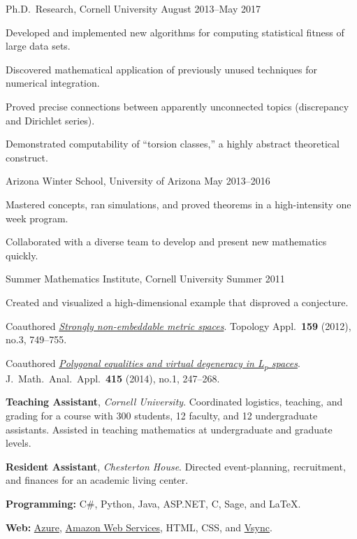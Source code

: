 \documentclass[11pt, letterpaper]{awesome-cv}
\begin{document}

\begin{cventries}

\cventry
	{Ph.D.~Research, Cornell University}
	{}{}
	{August 2013--May 2017}
	{
		\begin{cvitems}
			\item{Developed and implemented new algorithms for computing statistical fitness of large data sets.}
			\item{Discovered mathematical application of previously unused techniques for numerical integration.}
			\item{Proved precise connections between apparently unconnected topics (discrepancy and Dirichlet series).}
			\item{Demonstrated computability of ``torsion classes,'' a highly abstract theoretical construct.}
		\end{cvitems}
	}
		
\cventry
	{Arizona Winter School, University of Arizona}
	{}{}
	{May 2013--2016}
	{
		\begin{cvitems}
			\item{Mastered concepts, ran simulations, and proved theorems in a high-intensity one week program.}
			\item{Collaborated with a diverse team to develop and present new mathematics quickly.}
		\end{cvitems}
	}
	
\cventry
	{Summer Mathematics Institute, Cornell University}
	{}{}
	{Summer 2011}
	{
		\begin{cvitems}
			\item{Created and visualized a high-dimensional example that disproved a conjecture.}
			\item{Coauthored \href{http://dx.doi.org/10.1016/j.topol.2011.11.041}{\emph{Strongly non-embeddable metric spaces}}. Topology Appl.~\textbf{159} (2012), no.3, 749--755.}
			\item{Coauthored \href{http://dx.doi.org/10.1016/j.jmaa.2014.01.063}{\emph{Polygonal equalities and virtual degeneracy in L\textsubscript{p} spaces}}. J.~Math.~Anal.~Appl.~\textbf{415} (2014), no.1, 247--268.}
		\end{cvitems}
	}
\end{cventries}






\begin{cvparagraph}
\textbf{Teaching Assistant}, \emph{Cornell University}. Coordinated logistics, teaching, and grading for a course with 300 students, 12 faculty, and 12 undergraduate assistants.
Assisted in teaching mathematics at undergraduate and graduate levels.

\textbf{Resident Assistant}, \emph{Chesterton House}. Directed event-planning, recruitment, and finances for an academic living center. 
\end{cvparagraph}






\begin{cvparagraph}
\textbf{Programming:} C\#, Python, Java, ASP.NET, C, Sage, and \LaTeX.

\textbf{Web:} \href{https://azure.microsoft.com/}{Azure}, \href{https://aws.amazon.com/}{Amazon Web Services}, HTML, CSS, and \href{http://vsync.codeplex.com/}{Vsync}.
\end{cvparagraph}
\end{document}
